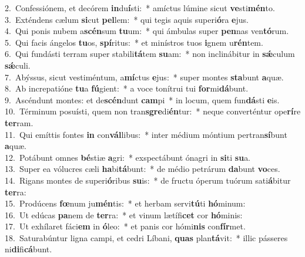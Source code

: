 {2.~}Confessiónem, et decórem \textbf{in}du\textbf{í}sti:~* amíctus lúmine sicut \textbf{ve}sti\textbf{mén}to.\\
{3.~}Exténdens cælum \textbf{si}cut \textbf{pel}lem:~* qui tegis aquis superi\textbf{ó}ra \textbf{e}jus.\\
{4.~}Qui ponis nubem a\textbf{scén}sum \textbf{tu}um:~* qui ámbulas super \textbf{pen}nas ven\textbf{tó}rum.\\
{5.~}Qui facis ángelos \textbf{tu}os, \textbf{spí}ritus:~* et minístros tuos \textbf{i}gnem u\textbf{rén}tem.\\
{6.~}Qui fundásti terram super stabili\textbf{tá}tem \textbf{su}am:~* non inclinábitur in \textbf{sǽ}culum \textbf{sǽ}culi.\\
{7.~}Abýssus, sicut vestiméntum, a\textbf{mí}ctus \textbf{e}jus:~* super montes \textbf{sta}bunt \textbf{a}quæ.\\
{8.~}Ab increpatióne \textbf{tu}a \textbf{fú}gient:~* a voce tonítrui tui \textbf{for}mi\textbf{dá}bunt.\\
{9.~}Ascéndunt montes: et de\textbf{scén}dunt \textbf{cam}pi~* in locum, quem fun\textbf{dá}sti \textbf{e}is.\\
{10.~}Términum posuísti, quem non tran\textbf{sgre}di\textbf{én}tur:~* neque converténtur ope\textbf{rí}re \textbf{ter}ram.\\
{11.~}Qui emíttis fontes \textbf{in} con\textbf{vál}libus:~* inter médium móntium pertran\textbf{sí}bunt \textbf{a}quæ.\\
{12.~}Potábunt omnes \textbf{bé}stiæ \textbf{a}gri:~* exspectábunt ónagri in \textbf{si}ti \textbf{su}a.\\
{13.~}Super ea vólucres cæli \textbf{ha}bi\textbf{tá}bunt:~* de médio petrárum \textbf{da}bunt \textbf{vo}ces.\\
{14.~}Rigans montes de superi\textbf{ó}ribus \textbf{su}is:~* de fructu óperum tuórum sati\textbf{á}bitur \textbf{ter}ra:\\
{15.~}Prodúcens \textbf{fœ}num ju\textbf{mén}tis:~* et herbam servi\textbf{tú}ti \textbf{hó}minum:\\
{16.~}Ut edúcas \textbf{pa}nem de \textbf{ter}ra:~* et vinum lætífi\textbf{cet} cor \textbf{hó}minis:\\
{17.~}Ut exhílaret fáci\textbf{em} in \textbf{ó}leo:~* et panis cor hómi\textbf{nis} con\textbf{fír}met.\\
{18.~}Saturabúntur ligna campi, et cedri Líbani, \textbf{quas} plan\textbf{tá}vit:~* illic pásseres ni\textbf{di}fi\textbf{cá}bunt.\\
